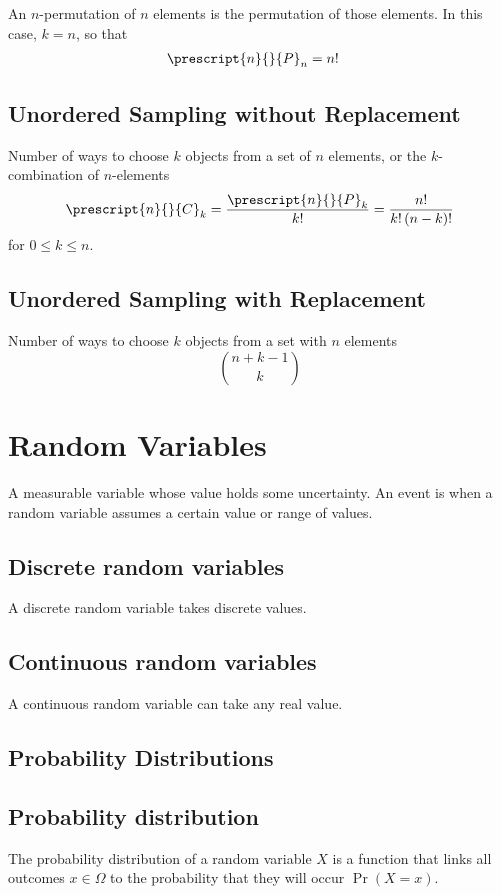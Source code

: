 \documentclass{article}
\begin{document}
\begin{multicols}{3}
    An \(n\)-permutation of \(n\) elements is the permutation of those elements.
    In this case, \(k = n\), so that
    \begin{align*}
        \prescript{n}{}{P}_n & = n!
    \end{align*}
    \subsection{Unordered Sampling without Replacement}
    Number of ways to choose \(k\) objects from a set of \(n\) elements,
    or the \(k\)-combination of \(n\)-elements
    \begin{align*}
        \prescript{n}{}{C}_k = \frac{\prescript{n}{}{P}_k}{k!} = \frac{n!}{k! \left( n - k \right)!}
    \end{align*}
    for \(0 \leq k \leq n\).
    \subsection{Unordered Sampling with Replacement}
    Number of ways to choose \(k\) objects from a set with \(n\) elements
    \begin{equation*}
        \binom{n + k - 1}{k}
    \end{equation*}
    \section{Random Variables}
    A measurable variable whose value holds some uncertainty.
    An event is when a random variable assumes a certain value or range of values.
    \subsection{Discrete random variables}
    A discrete random variable takes discrete values.
    \subsection{Continuous random variables}
    A continuous random variable can take any real value.
    \subsection{Probability Distributions}
    \subsection{Probability distribution}
    The probability distribution of a random variable \(X\) is a function that links all outcomes \(x \in \Omega\)
    to the probability that they will occur \(\Pr{\left( X = x \right)}\).

\end{multicols}
\end{document}
